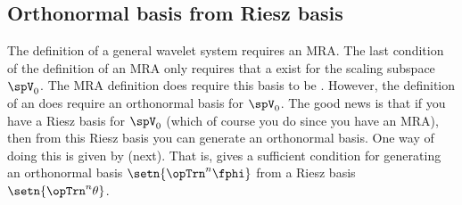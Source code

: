 \subsection{Orthonormal basis from Riesz basis}
The definition of a general wavelet system  requires an MRA.
The last condition of the definition of an MRA 
only requires that a  exist for
the scaling subspace $\spV_0$.
The MRA definition does  require this basis to be .
However, the definition of an 
does require an orthonormal basis for $\spV_0$.
The good news is that if you have a Riesz basis for $\spV_0$
(which of course you do since you have an MRA),
then from this Riesz basis you can generate an
orthonormal basis.
One way of doing this is given by  (next). That is,
gives a sufficient condition for generating
an orthonormal basis $\setn{\opTrn^n\fphi}$ from a
Riesz basis $\setn{\opTrn^n\theta}$.

